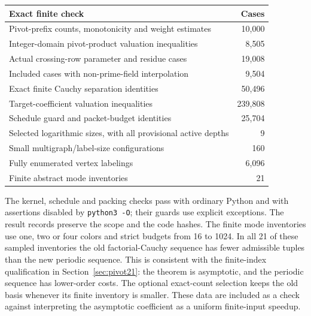\begin{center}\small
\begin{tabularx}{\textwidth}{@{}X r@{}}
\toprule
Exact finite check & Cases\\
\midrule
Pivot-prefix counts, monotonicity and weight estimates & 10,000\\
Integer-domain pivot-product valuation inequalities & 8,505\\
Actual crossing-row parameter and residue cases & 19,008\\
\quad Included cases with non-prime-field interpolation & 9,504\\
Exact finite Cauchy separation identities & 50,496\\
Target-coefficient valuation inequalities & 239,808\\
Schedule guard and packet-budget identities & 25,704\\
Selected logarithmic sizes, with all provisional active depths & 9\\
Small multigraph/label-size configurations & 160\\
\quad Fully enumerated vertex labelings & 6,096\\
Finite abstract mode inventories & 21\\
\bottomrule
\end{tabularx}
\end{center}

The kernel, schedule and packing checks pass with ordinary Python and
with assertions disabled by \texttt{python3 -O}; their guards use explicit
exceptions. The result records preserve the scope and the code hashes.
The finite mode inventories use one, two or four colors and strict budgets
from 16 to 1024. In all 21 of these sampled inventories the old
factorial-Cauchy sequence has fewer admissible tuples than the new periodic
sequence. This is consistent with the finite-index qualification in
Section~\ref{sec:pivot21}: the theorem is asymptotic, and the periodic
sequence has lower-order costs. The optional exact-count selection keeps
the old basis whenever its finite inventory is smaller. These data are
included as a check against interpreting the asymptotic coefficient as a
uniform finite-input speedup.
